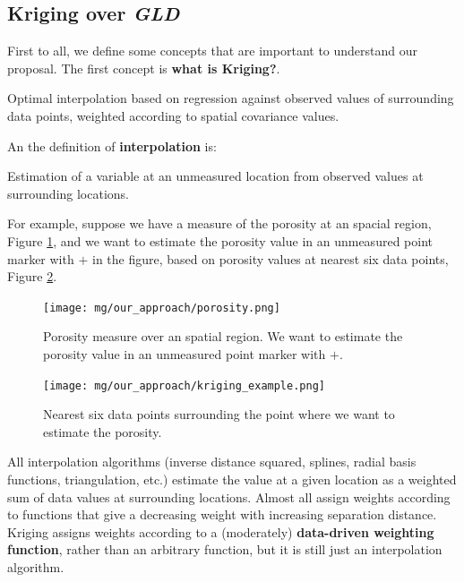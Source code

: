 \subsection{Kriging over \textit{GLD}}
First to all, we define some concepts that are important to understand our proposal. The first concept is \textbf{what is Kriging?}.

\begin{defn}
Optimal interpolation based on regression against observed values of surrounding data points, weighted according to spatial covariance values.
\end{defn}

An the definition of \textbf{interpolation} is: 

\begin{defn}
Estimation of a variable at an unmeasured location from observed values at surrounding locations.
\end{defn}

For example, suppose we have a measure of the porosity at an spacial region, Figure \ref{fig:porosity}, and we want to estimate the porosity value in an unmeasured point marker with $+$ in the figure, based on porosity values at nearest six data points, Figure \ref{fig:kriging_example}. 

\begin{figure}[ht]
    \centering
    \texttt{[image: mg/our\_approach/porosity.png]}
    \caption{Porosity measure over an spatial region. We want to estimate the porosity value in an unmeasured point marker with $+$.}
    \label{fig:porosity}
\end{figure}

\begin{figure}[ht]
    \centering
    \texttt{[image: mg/our\_approach/kriging\_example.png]}
    \caption{Nearest six data points surrounding the point where we want to estimate the porosity.}
    \label{fig:kriging_example}
\end{figure}

All interpolation algorithms (inverse distance squared, splines, radial basis functions, triangulation, etc.) estimate the value at a given location as a weighted sum of data values at surrounding locations. Almost all assign weights according to functions that give a decreasing weight with increasing separation distance. Kriging assigns weights according to a (moderately) \textbf{data-driven weighting function}, rather than an arbitrary function, but it is still just an interpolation algorithm.

